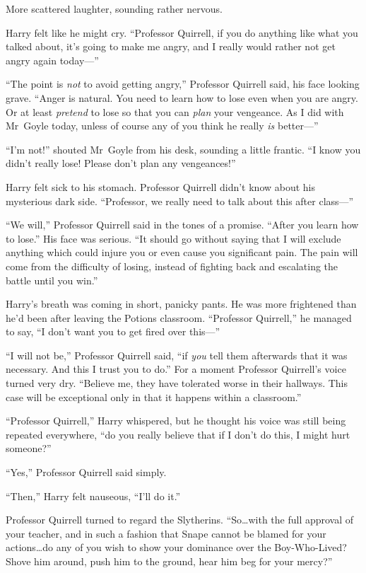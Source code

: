 More scattered laughter, sounding rather nervous.

Harry felt like he might cry. “Professor Quirrell, if you do anything like what you talked about, it’s going to make me angry, and I really would rather not get angry again today—”

“The point is \emph{not} to avoid getting angry,” Professor Quirrell said, his face looking grave. “Anger is natural. You need to learn how to lose even when you are angry. Or at least \emph{pretend} to lose so that you can \emph{plan} your vengeance. As I did with Mr~Goyle today, unless of course any of you think he really \emph{is} better—”

“I’m not!” shouted Mr~Goyle from his desk, sounding a little frantic. “I know you didn’t really lose! Please don’t plan any vengeances!”

Harry felt sick to his stomach. Professor Quirrell didn’t know about his mysterious dark side. “Professor, we really need to talk about this after class—”

“We will,” Professor Quirrell said in the tones of a promise. “After you learn how to lose.” His face was serious. “It should go without saying that I will exclude anything which could injure you or even cause you significant pain. The pain will come from the difficulty of losing, instead of fighting back and escalating the battle until you win.”

Harry’s breath was coming in short, panicky pants. He was more frightened than he’d been after leaving the Potions classroom. “Professor Quirrell,” he managed to say, “I don’t want you to get fired over this—”

“I will not be,” Professor Quirrell said, “if \emph{you} tell them afterwards that it was necessary. And this I trust you to do.” For a moment Professor Quirrell’s voice turned very dry. “Believe me, they have tolerated worse in their hallways. This case will be exceptional only in that it happens within a classroom.”

“Professor Quirrell,” Harry whispered, but he thought his voice was still being repeated everywhere, “do you really believe that if I don’t do this, I might hurt someone?”

“Yes,” Professor Quirrell said simply.

“Then,” Harry felt nauseous, “I’ll do it.”

Professor Quirrell turned to regard the Slytherins. “So…with the full approval of your teacher, and in such a fashion that Snape cannot be blamed for your actions…do any of you wish to show your dominance over the Boy-Who-Lived? Shove him around, push him to the ground, hear him beg for your mercy?”

